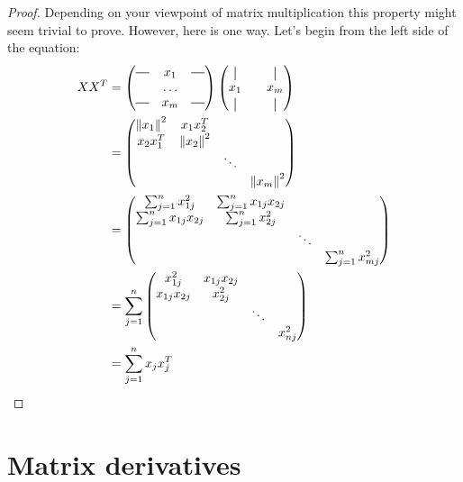 \begin{proof}
Depending on your viewpoint of matrix multiplication this property
might seem trivial to prove. However, here is one way. Let's begin 
from the left side of the equation:
\begin{equation}
\begin{split}
XX^T &=
\begin{pmatrix}
\horzbar & x_1 & \horzbar \\
& \hdots & \\
\horzbar & x_m & \horzbar \\
\end{pmatrix}
\begin{pmatrix}
\vertbar & & \vertbar \\
x_1 & & x_m \\
\vertbar & & \vertbar \\
\end{pmatrix}\\
&= \begin{pmatrix}
\norm{x_1}^2 & x_{1} x_{2}^T& \\
x_2 x_1^T & \norm{x_2}^2 &  & \\
& & \ddots & \\
& & & \norm{x_m}^2\\
\end{pmatrix}\\
&= \begin{pmatrix}
\sum_{j=1}^{n}x_{1j}^2 & \sum_{j=1}^{n} x_{1j}x_{2j} & \\
\sum_{j=1}^{n} x_{1j}x_{2j} & \sum_{j=1}^{n}x_{2j}^2  &  & \\
& & \ddots & \\
& & & \sum_{j=1}^{n}x_{mj}^2 \\
\end{pmatrix}\\
&= \sum_{j=1}^{n}
\begin{pmatrix}
x_{1j}^2 & x_{1j}x_{2j} & \\
x_{1j}x_{2j} & x_{2j}^2  &  & \\
& & \ddots & \\
& & & x_{nj}^2 \\
\end{pmatrix}\\
&= \sum_{j=1}^{n} x_jx_j^T
\end{split}
\end{equation}
\end{proof}
\section{Matrix derivatives}

